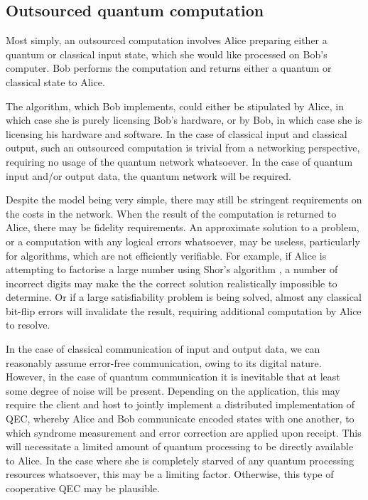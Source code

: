 \documentclass[aps,rmp,twocolumn,amsmath,amssymb,nofootinbib,superscriptaddress,longbibliography,floatfix]{revtex4-1}
\begin{document}
\subsection{Outsourced quantum computation}

Most simply, an outsourced computation involves Alice preparing either a quantum or classical input state, which she would like processed on Bob's computer. Bob performs the computation and returns either a quantum or classical state to Alice.

The algorithm, which Bob implements, could either be stipulated by Alice, in which case she is purely licensing Bob's hardware, or by Bob, in which case she is licensing his hardware and software. In the case of classical input and classical output, such an outsourced computation is trivial from a networking perspective, requiring no usage of the quantum network whatsoever. In the case of quantum input and/or output data, the quantum network will be required.

Despite the model being very simple, there may still be stringent requirements on the costs in the network. When the result of the computation is returned to Alice, there may be fidelity requirements. An approximate solution to a problem, or a computation with any logical errors whatsoever, may be useless, particularly for algorithms, which are not efficiently verifiable. For example, if Alice is attempting to factorise a large number using Shor's algorithm \cite{bib:ShorFactor}, a number of incorrect digits may make the the correct solution realistically impossible to determine. Or if a large satisfiability problem is being solved, almost any classical bit-flip errors will invalidate the result, requiring additional computation by Alice to resolve.

In the case of classical communication of input and output data, we can reasonably assume error-free communication, owing to its digital nature. However, in the case of quantum communication it is inevitable that at least some degree of noise will be present. Depending on the application, this may require the client and host to jointly implement a distributed implementation of QEC, whereby Alice and Bob communicate encoded states with one another, to which syndrome measurement and error correction are applied upon receipt. This will necessitate a limited amount of quantum processing to be directly available to Alice. In the case where she is completely starved of any quantum processing resources whatsoever, this may be a limiting factor. Otherwise, this type of cooperative QEC may be plausible.
\end{document}

